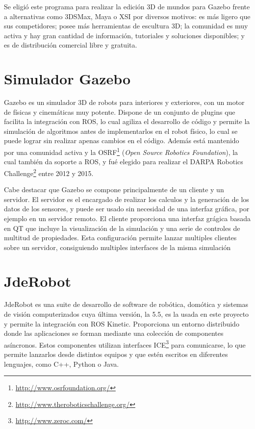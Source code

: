 Se eligió este programa para realizar la edición 3D de mundos para Gazebo frente a alternativas como 3DSMax, Maya o XSI por diversos motivos: es más ligero que sus competidores; posee más herramientas de escultura 3D; la comunidad es muy activa y hay gran cantidad de información, tutoriales y soluciones disponibles; y es de distribución comercial libre y gratuita. 


\section{Simulador Gazebo}
\label{sec:plat_gazebo}

Gazebo\cite{gazebo} es un simulador 3D de robots para interiores y exteriores, con un motor de físicas y cinemáticas muy potente. Dispone de un conjunto de plugins que facilita la integración con ROS, lo cual agiliza el desarrollo de código y permite la simulación de algoritmos antes de implementarlos en el robot físico, lo cual se puede lograr sin realizar apenas cambios en el código. Además está mantenido por una comunidad activa y la OSRF\footnote{\url{http://www.osrfoundation.org/}} (\textit{Open Source Robotics Foundation}), la cual también da soporte a ROS, y fué elegido para realizar el DARPA Robotics Challenge\footnote{\url{http://www.theroboticschallenge.org/}} entre 2012 y 2015.

Cabe destacar que Gazebo se compone principalmente de un cliente y un servidor. El servidor es el encargado de realizar los calculos y la generación de los datos de los sensores, y puede ser usado sin necesidad de una interfaz gráfica, por ejemplo en un servidor remoto. El cliente proporciona una interfaz grágica basada en QT que incluye la visualización de la simulación y una serie de controles de multitud de propiedades. Esta configuración permite lanzar multiples clientes sobre un servidor, consiguiendo multiples interfaces de la misma simulación

\section{JdeRobot}
\label{sec:plat_jderobot}

JdeRobot\cite{jderobot} es una suite de desarrollo de software de robótica, domótica y sistemas de visión computerizados cuya última versión, la 5.5, es la usada en este proyecto y permite la integración con ROS Kinetic. Proporciona un entorno distribuido donde las aplicaciones se forman mediante una colección de componentes asíncronos. Estos componentes utilizan interfaces ICE\footnote{\url{http://www.zeroc.com/}} para comunicarse, lo que permite lanzarlos desde distintos equipos y que estén escritos en diferentes lenguajes, como C++, Python o Java.


